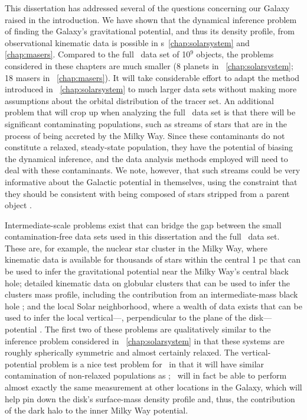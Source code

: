 This dissertation has addressed several of the questions concerning
our Galaxy raised in the introduction. We have shown that the
dynamical inference problem of finding the Galaxy's gravitational
potential, and thus its density profile, from observational kinematic
data is possible in \chaptername s~\ref{chap:solarsystem}
and \ref{chap:masers}. Compared to the full \Gaia\ data set of 10$^9$
objects, the problems considered in these chapters are much smaller (8
planets in \chaptername~\ref{chap:solarsystem}; 18 masers
in \chaptername~\ref{chap:masers}). It will take considerable effort
to adapt the method introduced in \chaptername~\ref{chap:solarsystem}
to much larger data sets without making more assumptions about the
orbital distribution of the tracer set. An additional problem that
will crop up when analyzing the full \Gaia\ data set is that there
will be significant contaminating populations, such as streams of
stars that are in the process of being accreted by the Milky
Way. Since these contaminants do not constitute a relaxed,
steady-state population, they have the potential of biasing the
dynamical inference, and the data analysis methods employed will need
to deal with these contaminants. We note, however, that such streams
could be very informative about the Galactic potential in themselves,
using the constraint that they should be consistent with being
composed of stars stripped from a parent
object \citep[\eg,][]{Koposov09a}.

Intermediate-scale problems exist that can bridge the gap between the
small contamination-free data sets used in this dissertation and the
full \Gaia\ data set. These are, for example, the nuclear star cluster
in the Milky Way, where kinematic data is available for thousands of
stars within the central 1 pc \citep{Schoedel09a} that can be used to
infer the gravitational potential near the Milky Way's central black
hole; detailed kinematic data on globular clusters that can be used to
infer the clusters mass profile, including the contribution from an
intermediate-mass black hole \citep{Anderson10a}; and the local Solar
neighborhood, where a wealth of data exists that can be used to infer
the local vertical---\ie, perpendicular to the plane of the
disk---potential \citep[\eg, RAVE;][]{Zwitter08a}. The first two of
these problems are qualitatively similar to the inference problem
considered in \chaptername~\ref{chap:solarsystem} in that these
systems are roughly spherically symmetric and almost certainly
relaxed. The vertical-potential problem is a nice test problem
for \Gaia\ in that it will have similar contamination of non-relaxed
populations as \Gaia; \Gaia\ will in fact be able to perform almost
exactly the same measurement at other locations in the Galaxy, which
will help pin down the disk's surface-mass density profile and, thus,
the contribution of the dark halo to the inner Milky Way potential.

